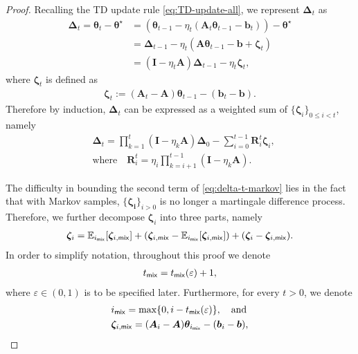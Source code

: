 \begin{proof}
Recalling the TD update rule \eqref{eq:TD-update-all}, we represent $\bm{\Delta}_t$ as
\begin{align*}
\bm{\Delta}_t = \bm{\theta}_t - \bm{\theta}^\star
&= (\bm{\theta}_{t-1}-\eta_t(\bm{A}_{t}\bm{\theta}_{t-1}-\bm{b}_{t})) - \bm{\theta}^\star\\
&= \bm{\Delta}_{t-1} - \eta_t (\bm{A}\bm{\theta}_{t-1}-\bm{b} + \bm{\zeta}_{t})\\
&= (\bm{I}-\eta_t \bm{A})\bm{\Delta}_{t-1} -\eta_t \bm{\zeta}_{t},
\end{align*}
where $\bm{\zeta}_t$ is defined as
\begin{align}\label{eq:defn-zetat}
\bm{\zeta}_t := (\bm{A}_t -\bm{A})\bm{\theta}_{t-1} - (\bm{b}_t-\bm{b}).
\end{align}
Therefore by induction, $\bm{\Delta}_t$ can be expressed as a weighted sum of $\{\bm{\zeta}_i\}_{0 \leq i < t}$, namely
\begin{align}
& \bm{\Delta}_t = \prod_{k=1}^{t} (\bm{I}-\eta_k \bm{A}) \bm{\Delta}_0 -\sum_{i=0}^{t-1} \bm{R}_i^t \bm{\zeta}_i,  \label{eq:delta-t-markov} \\ 
&  \text{where} \quad \bm{R}_i^t = \eta_i \prod_{k=i+1}^{t-1} (\bm{I}-\eta_k \bm{A}).
\end{align}

The difficulty in bounding the second term of \eqref{eq:delta-t-markov} lies in the fact that with Markov samples, $\{\bm{\zeta_i}\}_{i > 0}$ is no longer a martingale difference process. Therefore, we further decompose $\bm{\zeta}_i$ into three parts, namely
\begin{align}\label{eq:markov-zetai-decompose}
\bm{\zeta}_i = \mathbb{E}_{i_{\mathsf{mix}}}[\bm{\zeta}_{i,\mathsf{mix}}] + (\bm{\zeta}_{i,\mathsf{mix}} - \mathbb{E}_{i_{\mathsf{mix}}}[\bm{\zeta}_{i,\mathsf{mix}}]) + (\bm{\zeta}_i - \bm{\zeta}_{i,\mathsf{mix}}).
\end{align}
In order to simplify notation, throughout this proof we denote
\begin{align*}
t_{\mathsf{mix}} = t_{\mathsf{mix}}(\varepsilon) + 1,
\end{align*}
where $\varepsilon \in (0,1)$ is to be specified later. 
Furthermore, for every $t > 0$, we denote
\begin{align} 
&i_{\mathsf{mix}} = \max\{0,i - t_{\mathsf{mix}}(\varepsilon)\}, \quad \text{and} \label{eq:defn-t-imix}\\ 
&\bm{\zeta}_{i,\mathsf{mix}} = (\bm{A}_i - \bm{A})\bm{\theta}_{i_{\mathsf{mix}}} - (\bm{b}_i - \bm{b}),\label{eq:defn-zeta-imix}
\end{align}


\end{proof}
